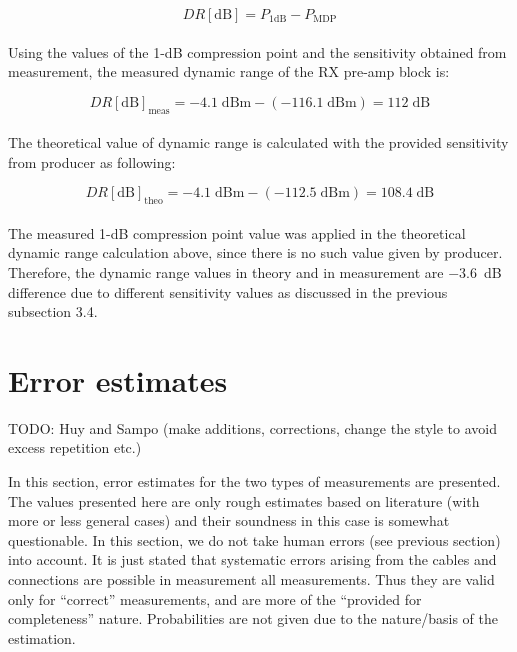 \documentclass[a4paper, 12pt]{article}
\begin{document}
\begin{equation}
DR[\mathrm{dB}] = P_\mathrm{1dB} - P_\mathrm{MDP} 
\end{equation}
\\

Using the values of the 1-dB compression point and the sensitivity obtained from measurement, the measured dynamic range of the RX pre-amp block is:

\begin{equation}
DR[\mathrm{dB}]_\mathrm{meas} = -4.1 \mathrm{\;dBm} - (-116.1 \mathrm{\;dBm}) = 112 \mathrm{\;dB}
\end{equation}
\\

The theoretical value of dynamic range is calculated with the provided sensitivity from producer as following:

\begin{equation}
DR[\mathrm{dB}]_\mathrm{theo} = -4.1 \mathrm{\;dBm} - (-112.5 \mathrm{\;dBm}) = 108.4 \mathrm{\;dB}
\end{equation}
\\

The measured 1-dB compression point value was applied in the theoretical dynamic range calculation above, since there is no such value given by producer. Therefore, the dynamic range values in theory and in measurement are $-3.6$~dB difference due to different sensitivity values as discussed in the previous subsection 3.4.


\newpage
\section{Error estimates}

TODO: Huy and Sampo (make additions, corrections, change the style to avoid excess 
repetition etc.)

In this section, error estimates for the two types of measurements are presented.
The values presented here are only rough estimates based on literature (with more 
or less general cases) and their soundness in this case is somewhat questionable. 
In this section, we do not take human errors (see previous section) into account. 
It is just stated that systematic errors arising from the cables and connections 
are possible in measurement all measurements. Thus they are valid only for 
``correct'' measurements, and are more of the ``provided for completeness'' 
nature. Probabilities are not given due to the nature/basis of the estimation.
\end{document}
